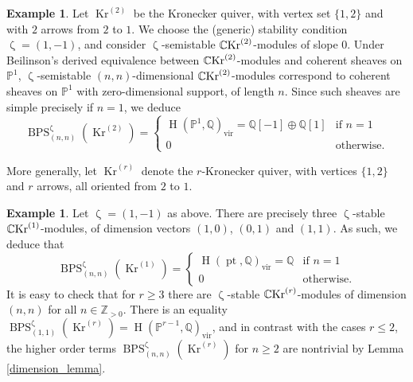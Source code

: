 \documentclass{amsart}
\DeclareMathOperator{\moKr}{Kr}
\newcommand{\Kr}[1]{\moKr^{(#1)}}
\newcommand{\CKr}[1]{\mathbb{C}\!\moKr^{(#1)}}
\DeclareMathOperator{\pt}{pt}
\newcommand{\QQ}{\mathbb{Q}}
\DeclareMathOperator{\HO}{H}
\DeclareMathOperator{\BPS}{BPS}
\DeclareMathOperator{\vir}{vir}
\def\!{\mskip-\thinmuskip}
\renewcommand{\zeta}{\upzeta}
\theoremstyle{plain}%
\theoremstyle{definition}
\newtheorem{eg}[thm]{Example}
\theoremstyle{remark}
\begin{document}
\begin{eg}\label{coh_K2}
Let $\Kr{2}$ be the Kronecker quiver, with vertex set $\{1,2\}$ and with $2$ arrows from $2$ to $1$.  We choose the (generic) stability condition $\zeta=(1,-1)$, and consider $\zeta$-semistable $\CKr{2}$-modules of slope $0$.  
Under Beilinson's derived equivalence \cite{Beil} between $\CKr{2}$-modules and coherent sheaves on $\mathbb{P}^1$, $\zeta$-semistable $(n,n)$-dimensional $\CKr{2}$-modules correspond to coherent sheaves on $\mathbb{P}^1$ with zero-dimensional support, of length $n$.  Since such sheaves are simple precisely if $n=1$, we deduce 
\[
\BPS_{(n,n)}^{\zeta}(\Kr{2})=\begin{cases}\HO(\mathbb{P}^1,\mathbb{Q})_{\vir}=\mathbb{Q}[-1]\oplus \mathbb{Q}[1]& \textrm{if }n=1\\
0&\textrm{otherwise.}
\end{cases}
\]
\end{eg}
More generally, let $\Kr{r}$ denote the $r$-Kronecker quiver, with vertices $\{1,2\}$ and $r$ arrows, all oriented from $2$ to $1$.  
\begin{eg}
\label{coh_Kplus}
Let $\zeta=(1,-1)$ as above.  There are precisely three $\zeta$-stable $\CKr{1}$-modules, of dimension vectors $(1,0)$, $(0,1)$ and $(1,1)$.  As such, we deduce that
\[
\BPS_{(n,n)}^{\zeta}(\Kr{1})=\begin{cases}\HO(\pt,\mathbb{Q})_{\vir}=\mathbb{Q}& \textrm{if }n=1\\
0&\textrm{otherwise.}
\end{cases}
\]
It is easy to check that for $r\geq 3$ there are $\zeta$-stable $\CKr{r}$-modules of dimension $(n,n)$ for all $n\in\mathbb{Z}_{>0}$.  There is an equality $\BPS_{(1,1)}^{\zeta}(\Kr{r})=\HO(\mathbb{P}^{r-1},\QQ)_{\vir}$, and in contrast with the cases $r\leq 2$, the higher order terms $\BPS_{(n,n)}^{\zeta}(\Kr{r})$ for $n\geq 2$ are nontrivial by Lemma \ref{dimension_lemma}.
\end{eg}
\end{document}
